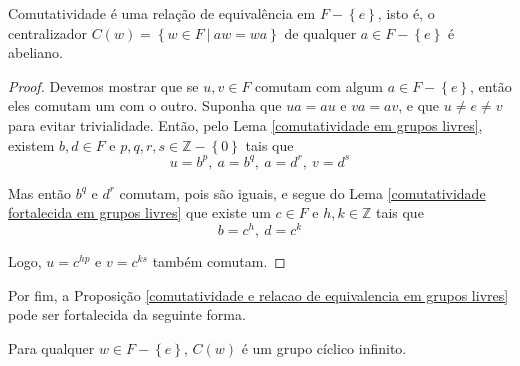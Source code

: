 	\begin{prop}
		\label{comutatividade e relacao de equivalencia em grupos livres}
		Comutatividade é uma relação de equivalência em $F - \left\{ e \right\}$, isto é, o centralizador $C(w) = \left\{ w\in F \ \vert \ aw = wa \right\}$ de qualquer $a\in F - \left\{e\right\}$ é abeliano.
	\end{prop}
	\begin{proof}
		Devemos mostrar que se $u,v\in F$ comutam com algum $a\in F - \left\{ e \right\}$, então eles comutam um com o outro. Suponha que $ua=au$ e $va = av$, e que $u\neq e\neq v$ para evitar trivialidade. Então, pelo Lema \eqref{comutatividade em grupos livres}, existem $b,d\in F$ e $p,q,r,s\in\mathbb{Z} - \left\{0\right\}$ tais que 
		\begin{equation*}
		u = b^p, \ a = b^q, \ a = d^r, \ v = d^s
		\end{equation*}
		\par\vspace{0.3cm} Mas então $b^q$ e $d^r$ comutam, pois são iguais, e segue do Lema \eqref{comutatividade fortalecida em grupos livres} que existe um $c\in F$ e $h,k\in\mathbb{Z}$ tais que
		\begin{equation*}
		b = c^h, \ d = c^k
		\end{equation*}
		\par\vspace{0.3cm} Logo, $u = c^{hp}$ e $v = c^{ks}$ também comutam.
	\end{proof}
	\par\vspace{0.3cm} Por fim, a Proposição \eqref{comutatividade e relacao de equivalencia em grupos livres} pode ser fortalecida da seguinte forma.
	\begin{theorem}
		\label{centralizadores em grupos livres}
		Para qualquer $w\in F - \left\{ e \right\}$, $C(w)$ é um grupo cíclico infinito.
	\end{theorem}
